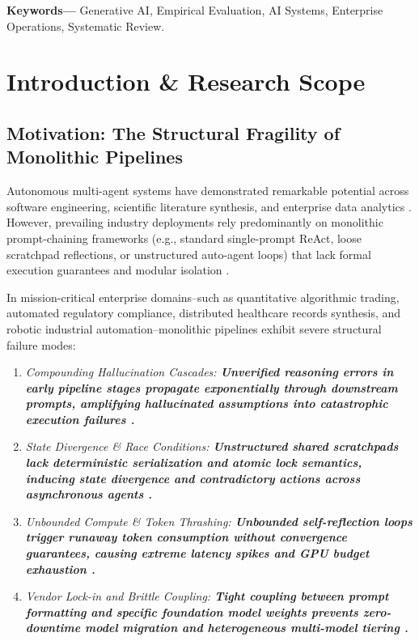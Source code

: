 \documentclass[10pt,twocolumn,letterpaper]{article}
\begin{document}
\noindent\textbf{Keywords---} Generative AI, Empirical Evaluation, AI Systems, Enterprise Operations, Systematic Review.







\section{Introduction \& Research Scope}



\subsection{Motivation: The Structural Fragility of Monolithic Pipelines}


Autonomous multi-agent systems have demonstrated remarkable potential across software engineering, scientific literature synthesis, and enterprise data analytics \cite{arxiv_2005_14165,arxiv_2203_02155}. However, prevailing industry deployments rely predominantly on monolithic prompt-chaining frameworks (e.g., standard single-prompt ReAct, loose scratchpad reflections, or unstructured auto-agent loops) that lack formal execution guarantees and modular isolation \cite{arxiv_2312_03893}.

In mission-critical enterprise domains--such as quantitative algorithmic trading, automated regulatory compliance, distributed healthcare records synthesis, and robotic industrial automation--monolithic pipelines exhibit severe structural failure modes:
\begin{enumerate}
  \item \textit{Compounding Hallucination Cascades:\textbf{ Unverified reasoning errors in early pipeline stages propagate exponentially through downstream prompts, amplifying hallucinated assumptions into catastrophic execution failures \cite{arxiv_2406_00584}.}}
  \item \textit{State Divergence \& Race Conditions:\textbf{ Unstructured shared scratchpads lack deterministic serialization and atomic lock semantics, inducing state divergence and contradictory actions across asynchronous agents \cite{arxiv_2501_02497}.}}
  \item \textit{Unbounded Compute \& Token Thrashing:\textbf{ Unbounded self-reflection loops trigger runaway token consumption without convergence guarantees, causing extreme latency spikes and GPU budget exhaustion \cite{arxiv_2405_01543,arxiv_2406_04028}.}}
  \item \textit{Vendor Lock-in and Brittle Coupling:\textbf{ Tight coupling between prompt formatting and specific foundation model weights prevents zero-downtime model migration and heterogeneous multi-model tiering \cite{arxiv_2305_18290,arxiv_2208_14227}.}}
\end{enumerate}
\end{document}
